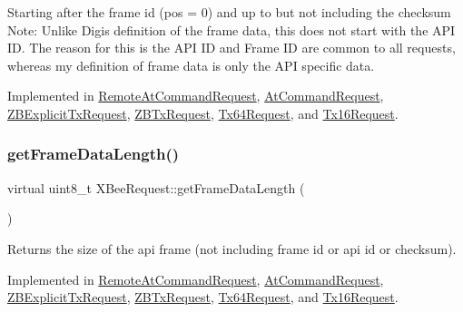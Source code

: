Starting after the frame id (pos = 0) and up to but not including the checksum Note\+: Unlike Digi\textquotesingle{}s definition of the frame data, this does not start with the A\+PI ID. The reason for this is the A\+PI ID and Frame ID are common to all requests, whereas my definition of frame data is only the A\+PI specific data. 

Implemented in \hyperlink{class_remote_at_command_request_a0e576cf564ebd5a82cb2ed05239a856a}{Remote\+At\+Command\+Request}, \hyperlink{class_at_command_request_aa4fc8f0c8404172cd5532f3d8e5564f2}{At\+Command\+Request}, \hyperlink{class_z_b_explicit_tx_request_a3d961e023bcf422543f65ed04da2240a}{Z\+B\+Explicit\+Tx\+Request}, \hyperlink{class_z_b_tx_request_ac81e09dfbf7aefbdf7f8b4838b643c5c}{Z\+B\+Tx\+Request}, \hyperlink{class_tx64_request_afe3662433da85acd21f8a3d90844a084}{Tx64\+Request}, and \hyperlink{class_tx16_request_af5ffbc2164e766d96f54c723996fd389}{Tx16\+Request}.

\hypertarget{class_x_bee_request_a03b6c558db5836fa7167c0fba7405642}{}\label{class_x_bee_request_a03b6c558db5836fa7167c0fba7405642} 
\subsubsection{\texorpdfstring{get\+Frame\+Data\+Length()}{getFrameDataLength()}}
{\footnotesize\ttfamily virtual uint8\+\_\+t X\+Bee\+Request\+::get\+Frame\+Data\+Length (\begin{DoxyParamCaption}{ }\end{DoxyParamCaption})\hspace{0.3cm}{\ttfamily [pure virtual]}}

Returns the size of the api frame (not including frame id or api id or checksum). 

Implemented in \hyperlink{class_remote_at_command_request_a1d78334a8924b0a0e06de6ef3a09c24f}{Remote\+At\+Command\+Request}, \hyperlink{class_at_command_request_aad12b8357e63fca9e95b6731a4bfda0d}{At\+Command\+Request}, \hyperlink{class_z_b_explicit_tx_request_a2dfcaf9ec7520f129b68966f814e318f}{Z\+B\+Explicit\+Tx\+Request}, \hyperlink{class_z_b_tx_request_a8e6914c1f556981a0f863c57c57d053b}{Z\+B\+Tx\+Request}, \hyperlink{class_tx64_request_afadc1e07718a62d6c5a75a4bb07dfaae}{Tx64\+Request}, and \hyperlink{class_tx16_request_a9a1ddfb380e72ecc09a024c6de6cdf8e}{Tx16\+Request}.

